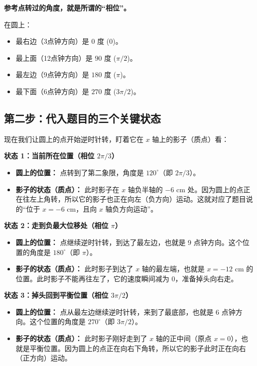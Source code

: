 \textbf{参考点转过的角度，就是所谓的“相位”。}

在圆上：
\begin{itemize}
	\item 最右边（3点钟方向）是 $0$ 度 ($0$)。
	\item 最上面（12点钟方向）是 $90$ 度 ($\pi/2$)。
	\item 最左边（9点钟方向）是 $180$ 度 ($\pi$)。
	\item 最下面（6点钟方向）是 $270$ 度 ($3\pi/2$)。
\end{itemize}

\subsection*{第二步：代入题目的三个关键状态}

现在我们让圆上的点开始逆时针转，盯着它在 $x$ 轴上的影子（质点）看：

\textbf{状态 1：当前所在位置（相位 $2\pi/3$）}
\begin{itemize}
	\item \textbf{圆上的位置：} 点转到了第二象限，角度是 $120^\circ$（即 $2\pi/3$）。
	\item \textbf{影子的状态（质点）：} 此时影子在 $x$ 轴负半轴的 $-6\text{ cm}$ 处。因为圆上的点正在往左上角转，所以它的影子也正在向左（负方向）运动。这就对应了题目说的“位于 $x = -6\text{ cm}$，且向 $x$ 轴负方向运动”。
\end{itemize}

\textbf{状态 2：走到负最大位移处（相位 $\pi$）}
\begin{itemize}
	\item \textbf{圆上的位置：} 点继续逆时针转，到达了最左边，也就是 9 点钟方向。这个位置的角度是 $180^\circ$（即 $\pi$）。
	\item \textbf{影子的状态（质点）：} 此时影子到达了 $x$ 轴的最左端，也就是 $x = -12\text{ cm}$ 的位置。此时影子不能再往左了，它的速度瞬间减为 $0$，准备掉头向右走。
\end{itemize}

\textbf{状态 3：掉头回到平衡位置（相位 $3\pi/2$）}
\begin{itemize}
	\item \textbf{圆上的位置：} 点从最左边继续逆时针转，来到了最底部，也就是 6 点钟方向。这个位置的角度是 $270^\circ$（即 $3\pi/2$）。
	\item \textbf{影子的状态（质点）：} 此时影子刚好走到了 $x$ 轴的正中间（原点 $x = 0$），也就是平衡位置。因为圆上的点正在向右下角转，所以它的影子此时正在向右（正方向）运动。
\end{itemize}

